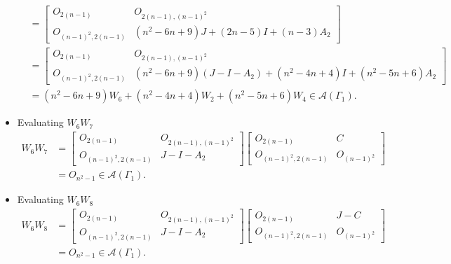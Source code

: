 \begin{itemize}
\begin{align*}
        &= \begin{bmatrix}
            O_{2(n-1)} & O_{2(n-1), (n-1)^2} \\
            O_{(n-1)^2, 2(n-1)} & (n^2-6n+9)J + (2n-5)I + (n-3)A_2
        \end{bmatrix}\\
        &= \begin{bmatrix}
            O_{2(n-1)} & O_{2(n-1), (n-1)^2} \\
            O_{(n-1)^2, 2(n-1)} & (n^2-6n+9)(J-I-A_2) + (n^2-4n+4)I + (n^2-5n+6)A_2
        \end{bmatrix}\\
        &= (n^2-6n+9)W_6 + (n^2-4n+4)W_2 + (n^2-5n+6)W_4\in\mathcal{A}(\Gamma_1).
    \end{align*}
    
    \item Evaluating $W_6W_7$
    \begin{align*}
        W_6W_7
        &= \begin{bmatrix}
            O_{2(n-1)} & O_{2(n-1), (n-1)^2} \\
            O_{(n-1)^2, 2(n-1)} & J-I-A_2
        \end{bmatrix}\begin{bmatrix}
            O_{2(n-1)} & C \\
            O_{(n-1)^2, 2(n-1)} & O_{(n-1)^2}
        \end{bmatrix}\\
        &= O_{n^2-1}\in\mathcal{A}(\Gamma_1).
    \end{align*}
    
    \item Evaluating $W_6W_8$
    \begin{align*}
        W_6W_8
        &= \begin{bmatrix}
            O_{2(n-1)} & O_{2(n-1), (n-1)^2} \\
            O_{(n-1)^2, 2(n-1)} & J-I-A_2
        \end{bmatrix}\begin{bmatrix}
            O_{2(n-1)} & J-C \\
            O_{(n-1)^2, 2(n-1)} & O_{(n-1)^2}
        \end{bmatrix}\\
        &= O_{n^2-1}\in\mathcal{A}(\Gamma_1).
    \end{align*}
    

\end{itemize}
